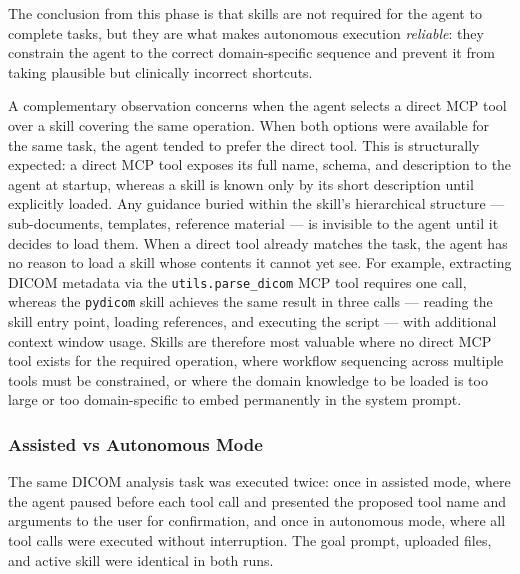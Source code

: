 \documentclass[conference]{IEEEtran}
\begin{document}
The conclusion from this phase is that skills are not required for the agent to complete tasks, but they are what makes autonomous execution \emph{reliable}: they constrain the agent to the correct domain-specific sequence and prevent it from taking plausible but clinically incorrect shortcuts.

A complementary observation concerns when the agent selects a direct MCP tool over a skill covering the same operation. When both options were available for the same task, the agent tended to prefer the direct tool. This is structurally expected: a direct MCP tool exposes its full name, schema, and description to the agent at startup, whereas a skill is known only by its short description until explicitly loaded. Any guidance buried within the skill's hierarchical structure --- sub-documents, templates, reference material --- is invisible to the agent until it decides to load them. When a direct tool already matches the task, the agent has no reason to load a skill whose contents it cannot yet see. For example, extracting DICOM metadata via the \texttt{utils.parse\_dicom} MCP tool requires one call, whereas the \texttt{pydicom} skill achieves the same result in three calls --- reading the skill entry point, loading references, and executing the script --- with additional context window usage. Skills are therefore most valuable where no direct MCP tool exists for the required operation, where workflow sequencing across multiple tools must be constrained, or where the domain knowledge to be loaded is too large or too domain-specific to embed permanently in the system prompt.

\subsubsection{Assisted vs Autonomous Mode}

The same DICOM analysis task was executed twice: once in assisted mode, where the agent paused before each tool call and presented the proposed tool name and arguments to the user for confirmation, and once in autonomous mode, where all tool calls were executed without interruption. The goal prompt, uploaded files, and active skill were identical in both runs.
\end{document}
